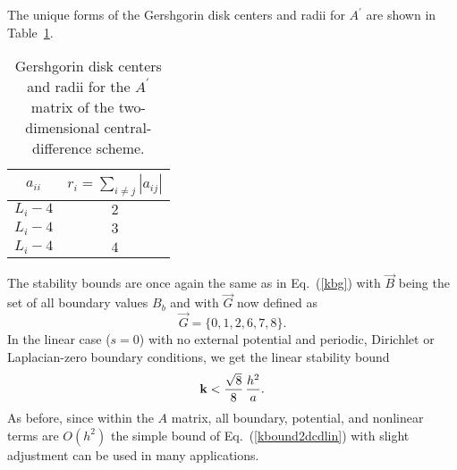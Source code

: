 \documentclass{article}
\begin{document}
The unique forms of the Gershgorin disk centers and radii for $A^{\prime}$ are shown in Table~\ref{t:2dcdgd}. 
\begin{table}[htbp] 
\centering 
\caption{Gershgorin disk centers and radii for the $A^{\prime}$ matrix of the two-dimensional central-difference scheme.}
\begin{tabular}{|c|c|} \hline
$a_{ii}$  & $r_i = \sum_{i\ne j} |a_{ij}|$ \\ \hline
$L_i - 4$ & $2$ \\
$L_i - 4$ & $3$ \\
$L_i - 4$ & $4$ \\
\hline
\end{tabular}
\label{t:2dcdgd}
\end{table}
The stability bounds are once again the same as in Eq.~(\ref{kbg}) with $\vec B$ being the set of all boundary values $B_b$ and with $\vec G$ now defined as
\begin{equation}
\label{G2DCD}
\vec G = \{0,1,2,6,7,8\}.
\end{equation}
In the linear case ($s=0$) with no external potential and periodic, Dirichlet or Laplacian-zero boundary conditions, we get the linear stability bound
\begin{equation}
\label{kbound2dcdlin}
{\bf k} < \frac{\sqrt{8}}{8}\,\frac{h^2}{a}.
\end{equation}
As before, since within the $A$ matrix, all boundary, potential, and nonlinear terms are $O(h^2)$ the simple bound of Eq.~(\ref{kbound2dcdlin}) with slight adjustment can be used in many applications.
\end{document}
